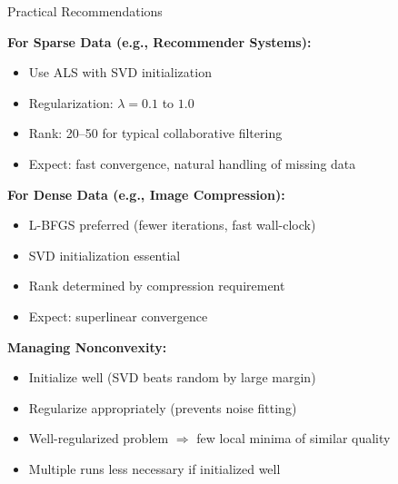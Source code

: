 \documentclass[aspectratio=169,usenames,dvipsnames]{beamer}
\begin{document}
\begin{frame}{Practical Recommendations}

\textbf{For Sparse Data (e.g., Recommender Systems):}
\begin{itemize}
  \item Use ALS with SVD initialization
  \item Regularization: $\lambda = 0.1$ to $1.0$
  \item Rank: 20--50 for typical collaborative filtering
  \item Expect: fast convergence, natural handling of missing data
\end{itemize}

\vspace{0.3cm}

\textbf{For Dense Data (e.g., Image Compression):}
\begin{itemize}
  \item L-BFGS preferred (fewer iterations, fast wall-clock)
  \item SVD initialization essential
  \item Rank determined by compression requirement
  \item Expect: superlinear convergence
\end{itemize}

\vspace{0.3cm}

\textbf{Managing Nonconvexity:}
\begin{itemize}
  \item Initialize well (SVD beats random by large margin)
  \item Regularize appropriately (prevents noise fitting)
  \item Well-regularized problem $\Rightarrow$ few local minima of similar quality
  \item Multiple runs less necessary if initialized well
\end{itemize}

\end{frame}
\end{document}
